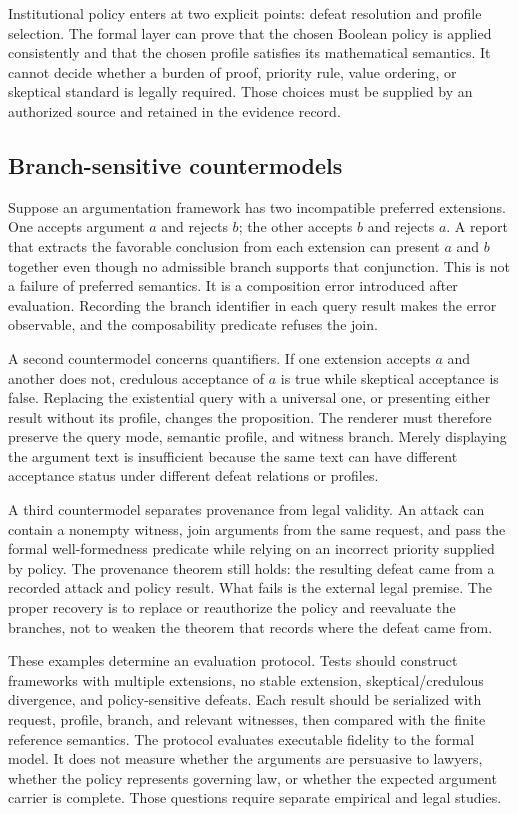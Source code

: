 Institutional policy enters at two explicit points: defeat resolution and profile selection. The formal layer can prove that the chosen Boolean policy is applied consistently and that the chosen profile satisfies its mathematical semantics. It cannot decide whether a burden of proof, priority rule, value ordering, or skeptical standard is legally required. Those choices must be supplied by an authorized source and retained in the evidence record.

\subsection{Branch-sensitive countermodels}

Suppose an argumentation framework has two incompatible preferred extensions. One accepts argument $a$ and rejects $b$; the other accepts $b$ and rejects $a$. A report that extracts the favorable conclusion from each extension can present $a$ and $b$ together even though no admissible branch supports that conjunction. This is not a failure of preferred semantics. It is a composition error introduced after evaluation. Recording the branch identifier in each query result makes the error observable, and the composability predicate refuses the join.

A second countermodel concerns quantifiers. If one extension accepts $a$ and another does not, credulous acceptance of $a$ is true while skeptical acceptance is false. Replacing the existential query with a universal one, or presenting either result without its profile, changes the proposition. The renderer must therefore preserve the query mode, semantic profile, and witness branch. Merely displaying the argument text is insufficient because the same text can have different acceptance status under different defeat relations or profiles.

A third countermodel separates provenance from legal validity. An attack can contain a nonempty witness, join arguments from the same request, and pass the formal well-formedness predicate while relying on an incorrect priority supplied by policy. The provenance theorem still holds: the resulting defeat came from a recorded attack and policy result. What fails is the external legal premise. The proper recovery is to replace or reauthorize the policy and reevaluate the branches, not to weaken the theorem that records where the defeat came from.

These examples determine an evaluation protocol. Tests should construct frameworks with multiple extensions, no stable extension, skeptical/credulous divergence, and policy-sensitive defeats. Each result should be serialized with request, profile, branch, and relevant witnesses, then compared with the finite reference semantics. The protocol evaluates executable fidelity to the formal model. It does not measure whether the arguments are persuasive to lawyers, whether the policy represents governing law, or whether the expected argument carrier is complete. Those questions require separate empirical and legal studies.
